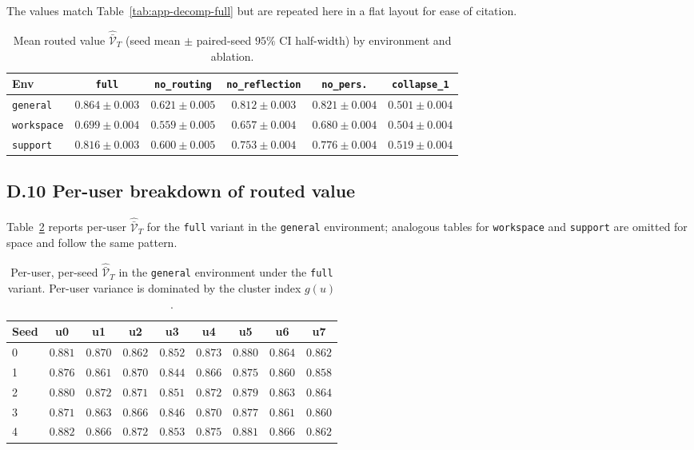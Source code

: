 \documentclass{article} %
\begin{document}
The values match Table~\ref{tab:app-decomp-full} but are repeated here in a flat layout for ease of citation.

\begin{table}[h]
\centering
\small
\begin{tabular}{lccccc}
\toprule
Env & \texttt{full} & \texttt{no\_routing} & \texttt{no\_reflection} & \texttt{no\_pers.} & \texttt{collapse\_1} \\
\midrule
\texttt{general}   & $0.864 \pm 0.003$ & $0.621 \pm 0.005$ & $0.812 \pm 0.003$ & $0.821 \pm 0.004$ & $0.501 \pm 0.004$ \\
\texttt{workspace} & $0.699 \pm 0.004$ & $0.559 \pm 0.005$ & $0.657 \pm 0.004$ & $0.680 \pm 0.004$ & $0.504 \pm 0.004$ \\
\texttt{support}   & $0.816 \pm 0.003$ & $0.600 \pm 0.005$ & $0.753 \pm 0.004$ & $0.776 \pm 0.004$ & $0.519 \pm 0.004$ \\
\bottomrule
\end{tabular}
\caption{Mean routed value $\widehat{\bar{\mathcal V}}_T$ (seed mean $\pm$ paired-seed $95\%$ CI half-width) by environment and ablation.}
\label{tab:app-mean-reward}
\end{table}

\subsection{D.10 Per-user breakdown of routed value}

\label{app:tab-peruser}

Table~\ref{tab:app-peruser} reports per-user $\widehat{\bar{\mathcal V}}_T$ for the \texttt{full} variant in the \texttt{general} environment; analogous tables for \texttt{workspace} and \texttt{support} are omitted for space and follow the same pattern.

\begin{table}[h]
\centering
\small
\begin{tabular}{lcccccccc}
\toprule
Seed & u0 & u1 & u2 & u3 & u4 & u5 & u6 & u7 \\
\midrule
0 & $0.881$ & $0.870$ & $0.862$ & $0.852$ & $0.873$ & $0.880$ & $0.864$ & $0.862$ \\
1 & $0.876$ & $0.861$ & $0.870$ & $0.844$ & $0.866$ & $0.875$ & $0.860$ & $0.858$ \\
2 & $0.880$ & $0.872$ & $0.871$ & $0.851$ & $0.872$ & $0.879$ & $0.863$ & $0.864$ \\
3 & $0.871$ & $0.863$ & $0.866$ & $0.846$ & $0.870$ & $0.877$ & $0.861$ & $0.860$ \\
4 & $0.882$ & $0.866$ & $0.872$ & $0.853$ & $0.875$ & $0.881$ & $0.866$ & $0.862$ \\
\bottomrule
\end{tabular}
\caption{Per-user, per-seed $\widehat{\bar{\mathcal V}}_T$ in the \texttt{general} environment under the \texttt{full} variant. Per-user variance is dominated by the cluster index $g(u)$.}
\label{tab:app-peruser}
\end{table}
\end{document}
